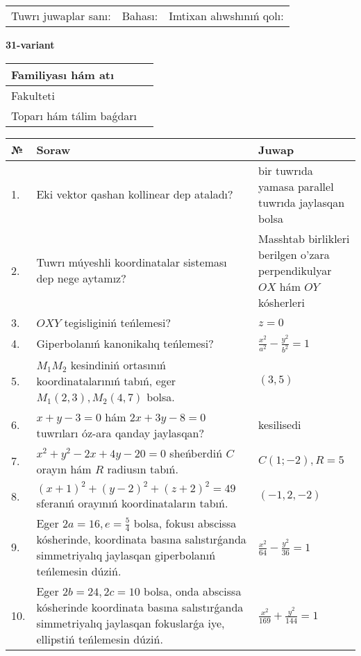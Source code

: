 \documentclass{article}
\begin{document}
\vspace{1cm}

\begin{tabular}{lll}
Tuwrı juwaplar sanı: \underline{\hspace{1.5cm}} & 
Bahası: \underline{\hspace{1.5cm}} & 
Imtixan alıwshınıń qolı: \underline{\hspace{2cm}} \\
\end{tabular}

\egroup

\newpage


\textbf{31-variant}\\

\bgroup
\def\arraystretch{1.6} %

\begin{tabular}{|m{5.7cm}|m{9.5cm}|}
\hline
Familiyası hám atı & \\
\hline
Fakulteti  & \\
\hline
Toparı hám tálim baǵdarı  & \\
\hline
\end{tabular}

\vspace{1cm}

\begin{tabular}{|m{0.7cm}|m{10cm}|m{4cm}|}
\hline
№ & Soraw & Juwap \\
\hline
1. & Eki vektor qashan kollinear dep ataladı? & bir tuwrıda yamasa parallel tuwrıda jaylasqan bolsa \\
\hline
2. & Tuwrı múyeshli koordinatalar sisteması dep nege aytamız? & Masshtab birlikleri berilgen o'zara perpendikulyar $OX$ hám $OY$ kósherleri \\
\hline
3. & $OXY$ tegisliginiń teńlemesi? & $z=0$ \\
\hline
4. & Giperbolanıń kanonikalıq teńlemesi? & $\frac{x^2}{a^2}-\frac{y^2}{b^2}=1$ \\
\hline
5. & $M_{1}M_{2}$ kesindiniń ortasınıń koordinatalarınıń tabıń, eger $M_{1} (2, 3), M_{2} (4, 7)$ bolsa. & $(3,5)$ \\
\hline
6. & $x+y-3=0$ hám $2x+3y-8=0$ tuwrıları óz-ara qanday jaylasqan? & kesilisedi \\
\hline
7. & $x^{2}+y^{2}-2x+4y-20=0$ sheńberdiń $C$ orayın hám $R$ radiusın tabıń. & $C(1;-2), R=5$ \\
\hline
8. & $(x+1)^{2}+(y-2) ^{2}+(z+2) ^{2}=49$ sferanıń orayınıń koordinataların tabıń. & $(-1,2,-2)$ \\
\hline
9. & Eger $2a=16, e=\frac{5}{4}$ bolsa, fokusı abscissa kósherinde, koordinata basına salıstırǵanda simmetriyalıq jaylasqan giperbolanıń teńlemesin dúziń. & $\frac{x^{2}}{64}-\frac{y^{2}}{36}=1$ \\
\hline
10. & Eger $2b=24, 2 c=10$ bolsa, onda abscissa kósherinde koordinata basına salıstırǵanda simmetriyalıq jaylasqan fokuslarǵa iye, ellipstiń teńlemesin dúziń. & $\frac{x^{2}}{169}+\frac{y^{2}}{144}=1$ \\
\hline
\end{tabular}
\end{document}
